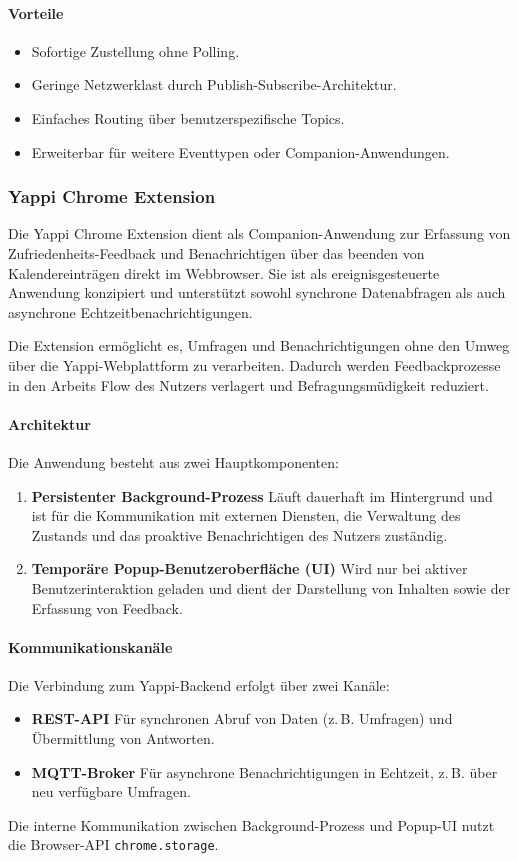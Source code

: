 \documentclass[12pt,a4paper]{report}
\begin{document}
\paragraph{Vorteile}
    \begin{itemize}
        \item Sofortige Zustellung ohne Polling.
        \item Geringe Netzwerklast durch Publish-Subscribe-Architektur.
        \item Einfaches Routing über benutzerspezifische Topics.
        \item Erweiterbar für weitere Eventtypen oder Companion-Anwendungen.
    \end{itemize}


\subsubsection{Yappi Chrome Extension}
    Die Yappi Chrome Extension dient als Companion-Anwendung zur Erfassung von Zufriedenheits-Feedback und Benachrichtigen
    über das beenden von Kalendereinträgen direkt im Webbrowser.
    Sie ist als ereignisgesteuerte Anwendung konzipiert und unterstützt sowohl synchrone Datenabfragen als auch
    asynchrone Echtzeitbenachrichtigungen.

    Die Extension ermöglicht es, Umfragen und Benachrichtigungen ohne den Umweg über die Yappi-Webplattform zu verarbeiten.
    Dadurch werden Feedbackprozesse in den Arbeits Flow des Nutzers verlagert und Befragungsmüdigkeit reduziert.

\paragraph{Architektur}
    Die Anwendung besteht aus zwei Hauptkomponenten:
    \begin{enumerate}
      \item \textbf{Persistenter Background-Prozess}
            Läuft dauerhaft im Hintergrund und ist für die Kommunikation mit externen Diensten, die Verwaltung des Zustands
            und das proaktive Benachrichtigen des Nutzers zuständig.
      \item \textbf{Temporäre Popup-Benutzeroberfläche (UI)}
            Wird nur bei aktiver Benutzerinteraktion geladen und dient der Darstellung von Inhalten sowie der Erfassung von Feedback.
    \end{enumerate}


\paragraph{Kommunikationskanäle}
    Die Verbindung zum Yappi-Backend erfolgt über zwei Kanäle:
    \begin{itemize}
      \item \textbf{REST-API} Für synchronen Abruf von Daten (z.\,B. Umfragen) und Übermittlung von Antworten.
      \item \textbf{MQTT-Broker} Für asynchrone Benachrichtigungen in Echtzeit, z.\,B. über neu verfügbare Umfragen.
    \end{itemize}
    Die interne Kommunikation zwischen Background-Prozess und Popup-UI nutzt die Browser-API \texttt{chrome.storage}.
\end{document}
